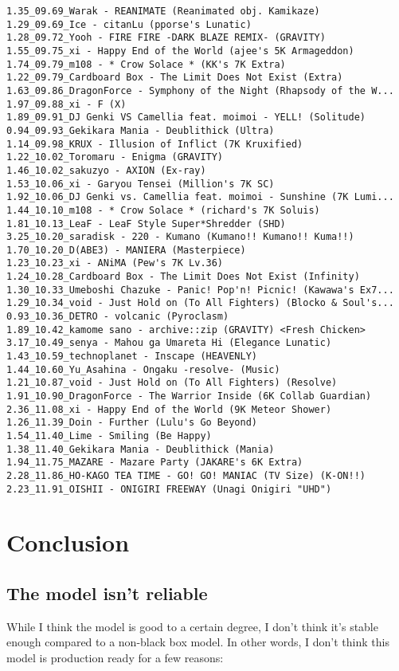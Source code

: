 \begin{lstlisting}
1.35_09.69_Warak - REANIMATE (Reanimated obj. Kamikaze)
1.29_09.69_Ice - citanLu (pporse's Lunatic)
1.28_09.72_Yooh - FIRE FIRE -DARK BLAZE REMIX- (GRAVITY)
1.55_09.75_xi - Happy End of the World (ajee's 5K Armageddon)
1.74_09.79_m108 - * Crow Solace * (KK's 7K Extra)
1.22_09.79_Cardboard Box - The Limit Does Not Exist (Extra)
1.63_09.86_DragonForce - Symphony of the Night (Rhapsody of the W...
1.97_09.88_xi - F (X)
1.89_09.91_DJ Genki VS Camellia feat. moimoi - YELL! (Solitude)
0.94_09.93_Gekikara Mania - Deublithick (Ultra)
1.14_09.98_KRUX - Illusion of Inflict (7K Kruxified)
1.22_10.02_Toromaru - Enigma (GRAVITY)
1.46_10.02_sakuzyo - AXION (Ex-ray)
1.53_10.06_xi - Garyou Tensei (Million's 7K SC)
1.92_10.06_DJ Genki vs. Camellia feat. moimoi - Sunshine (7K Lumi...
1.44_10.10_m108 - * Crow Solace * (richard's 7K Soluis)
1.81_10.13_LeaF - LeaF Style Super*Shredder (SHD)
3.25_10.20_saradisk - 220 - Kumano (Kumano!! Kumano!! Kuma!!)
1.70_10.20_D(ABE3) - MANIERA (Masterpiece)
1.23_10.23_xi - ANiMA (Pew's 7K Lv.36)
1.24_10.28_Cardboard Box - The Limit Does Not Exist (Infinity)
1.30_10.33_Umeboshi Chazuke - Panic! Pop'n! Picnic! (Kawawa's Ex7...
1.29_10.34_void - Just Hold on (To All Fighters) (Blocko & Soul's...
0.93_10.36_DETRO - volcanic (Pyroclasm)
1.89_10.42_kamome sano - archive::zip (GRAVITY) <Fresh Chicken>
3.17_10.49_senya - Mahou ga Umareta Hi (Elegance Lunatic)
1.43_10.59_technoplanet - Inscape (HEAVENLY)
1.44_10.60_Yu_Asahina - Ongaku -resolve- (Music)
1.21_10.87_void - Just Hold on (To All Fighters) (Resolve)
1.91_10.90_DragonForce - The Warrior Inside (6K Collab Guardian)
2.36_11.08_xi - Happy End of the World (9K Meteor Shower)
1.26_11.39_Doin - Further (Lulu's Go Beyond)
1.54_11.40_Lime - Smiling (Be Happy)
1.38_11.40_Gekikara Mania - Deublithick (Mania)
1.94_11.75_MAZARE - Mazare Party (JAKARE's 6K Extra)
2.28_11.86_HO-KAGO TEA TIME - GO! GO! MANIAC (TV Size) (K-ON!!)
2.23_11.91_OISHII - ONIGIRI FREEWAY (Unagi Onigiri "UHD")

\end{lstlisting}

\section{Conclusion}

\subsection{The model isn't reliable}

While I think the model is good to a certain degree, I don't think it's stable enough compared to a non-black box model. In other words, I don't think this model is production ready for a few reasons:

